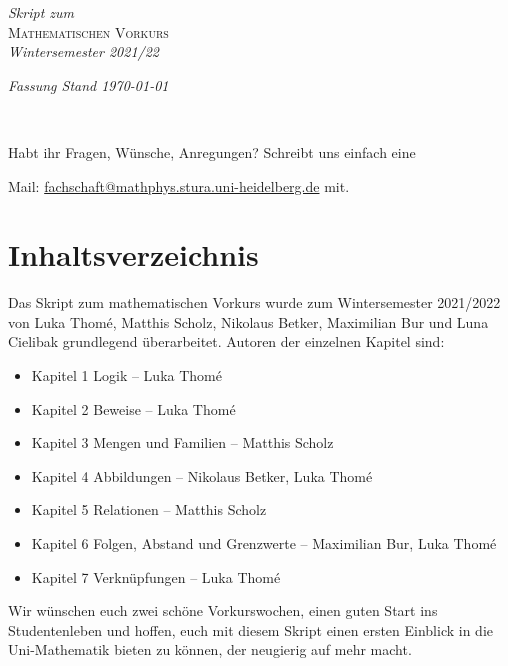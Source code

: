 \documentclass[12pt,BCOR1cm,ngerman,DIV15,fleqn,chapterprefix,headings=small]{ST1-book}
\makeatletter
\def\tableofcontents{
\vspace{-2em}
\chapter*{\dgrau Inhaltsverzeichnis}
\vspace*{-2em}
\@starttoc{toc}
}
\makeatother
\begin{document}
\frontmatter
\renewcommand{\thepage}{\roman{page}}
\thispagestyle{first}
\vspace*{5cm}
\begin{center}
{\large\normalfont\itshape  Skript zum}\\[3ex]
{\huge\normalfont\scshape  Mathematischen Vorkurs}\\[5ex]
{\large\normalfont\itshape  Wintersemester 2021/22}\end{center}
 \vfill
\centerline{{\normalfont\itshape Fassung Stand \today}}\hfill\\[1ex]
\centerline{{\db\small Habt ihr Fragen, Wünsche, Anregungen? Schreibt uns einfach eine}}  
\centerline{{\db\small  Mail:
\href{fachschaft@mathphys.stura.uni-heidelberg.de}{fachschaft@mathphys.stura.uni-heidelberg.de}
mit.}}
\cleardoublepage
\setcounter{page}{1}
\pagestyle{tablematiere}
\tableofcontents
\mainmatter

\pagestyle{scrheadings}

\pagestyle{intro}
\noindent Das Skript zum mathematischen Vorkurs wurde zum Wintersemester 2021/2022 von Luka Thomé, Matthis Scholz, Nikolaus Betker, Maximilian Bur und Luna Cielibak grundlegend überarbeitet. Autoren der einzelnen Kapitel sind:
\begin{itemize}
 \item Kapitel 1 Logik -- Luka Thomé
 \item Kapitel 2 Beweise -- Luka Thomé
 \item Kapitel 3 Mengen und Familien -- Matthis Scholz
 \item Kapitel 4 Abbildungen -- Nikolaus Betker, Luka Thomé
  \item Kapitel 5 Relationen -- Matthis Scholz
 \item Kapitel 6 Folgen, Abstand und Grenzwerte -- Maximilian Bur, Luka Thomé
 \item Kapitel 7 Verknüpfungen -- Luka Thomé
\end{itemize}

\noindent Wir wünschen euch zwei schöne Vorkurswochen, einen guten Start ins Studentenleben und hoffen, euch mit diesem Skript einen ersten Einblick in die Uni-Mathematik bieten zu können, der neugierig auf mehr macht. \\
\end{document}
